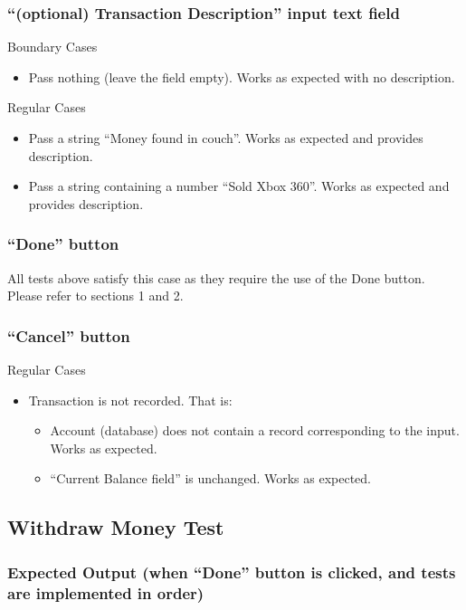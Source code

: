 \documentclass[12pt]{article}
\begin{document}
\subsubsection{``(optional) Transaction Description'' input text field}

Boundary Cases
\begin{itemize}
  \item Pass nothing (leave the field empty). Works as expected with no description.
\end{itemize}

Regular Cases
\begin{itemize}
  \item Pass a string ``Money found in couch''. Works as expected and provides description.
  \item Pass a string containing a number ``Sold Xbox 360''. Works as expected and provides description.
\end{itemize}

\subsubsection{``Done'' button}

All tests above satisfy this case as they require the use of the Done button. Please refer to sections 1 and 2.
	
\subsubsection{``Cancel'' button}

Regular Cases
\begin{itemize}
  \item Transaction is not recorded. That is:
  \begin{itemize}
    \item Account (database) does not contain a record corresponding to the input. Works as expected.
    \item ``Current Balance field'' is unchanged. Works as expected.
  \end{itemize}
\end{itemize}

\subsection{Withdraw Money Test}

\subsubsection{Expected Output (when ``Done'' button is clicked, and tests are implemented in order)}
\end{document}
